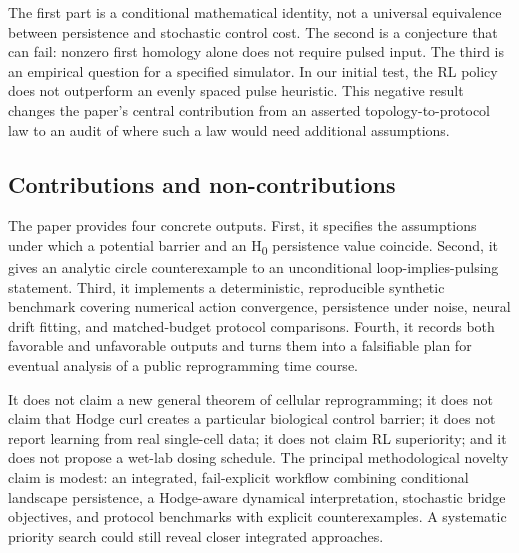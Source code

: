 \documentclass[11pt]{article}
\newcommand{\1}{\mathbf{1}}
\begin{document}
The first part is a conditional mathematical identity, not a universal equivalence between persistence and stochastic control cost. The second is a conjecture that can fail: nonzero first homology alone does not require pulsed input. The third is an empirical question for a specified simulator. In our initial test, the RL policy does not outperform an evenly spaced pulse heuristic. This negative result changes the paper's central contribution from an asserted topology-to-protocol law to an audit of where such a law would need additional assumptions.

\subsection{Contributions and non-contributions}
The paper provides four concrete outputs. First, it specifies the assumptions under which a potential barrier and an H\textsubscript{0} persistence value coincide. Second, it gives an analytic circle counterexample to an unconditional loop-implies-pulsing statement. Third, it implements a deterministic, reproducible synthetic benchmark covering numerical action convergence, persistence under noise, neural drift fitting, and matched-budget protocol comparisons. Fourth, it records both favorable and unfavorable outputs and turns them into a falsifiable plan for eventual analysis of a public reprogramming time course.

It does not claim a new general theorem of cellular reprogramming; it does not claim that Hodge curl creates a particular biological control barrier; it does not report learning from real single-cell data; it does not claim RL superiority; and it does not propose a wet-lab dosing schedule. The principal methodological novelty claim is modest: an integrated, fail-explicit workflow combining conditional landscape persistence, a Hodge-aware dynamical interpretation, stochastic bridge objectives, and protocol benchmarks with explicit counterexamples. A systematic priority search could still reveal closer integrated approaches.
\end{document}
